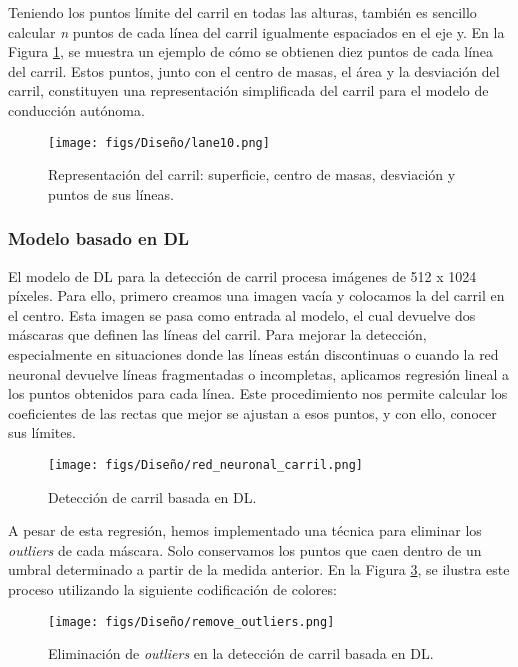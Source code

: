 Teniendo los puntos límite del carril en todas las alturas, también es sencillo calcular \textit{n} puntos de cada línea del carril igualmente espaciados en el eje y. En la Figura \ref{fig:puntos_carril}, se muestra un ejemplo de cómo se obtienen diez puntos de cada línea del carril. Estos puntos, junto con el centro de masas, el área y la desviación del carril, constituyen una representación simplificada del carril para el modelo de conducción autónoma.

\begin{figure}[ht]
  \centering
  \texttt{[image: figs/Diseño/lane10.png]}
  \caption{Representación del carril: superficie, centro de masas, desviación y puntos de sus líneas.}
  \label{fig:puntos_carril}
\end{figure}

\subsubsection{Modelo basado en \ac{DL}}

El modelo de \ac{DL} para la detección de carril procesa imágenes de 512 x 1024 píxeles. Para ello, primero creamos una imagen vacía y colocamos la del carril en el centro. Esta imagen se pasa como entrada al modelo, el cual devuelve dos máscaras que definen las líneas del carril. Para mejorar la detección, especialmente en situaciones donde las líneas están discontinuas o cuando la red neuronal devuelve líneas fragmentadas o incompletas, aplicamos regresión lineal a los puntos obtenidos para cada línea. Este procedimiento nos permite calcular los coeficientes de las rectas que mejor se ajustan a esos puntos, y con ello, conocer sus límites.

\begin{figure}[ht]
  \centering
  \texttt{[image: figs/Diseño/red\_neuronal\_carril.png]}
  \caption{Detección de carril basada en \ac{DL}.}
  \label{fig:dl_final_carril}
\end{figure}

A pesar de esta regresión, hemos implementado una técnica para eliminar los \textit{outliers} de cada máscara. Solo conservamos los puntos que caen dentro de un umbral determinado a partir de la medida anterior. En la Figura \ref{fig:outliers}, se ilustra este proceso utilizando la siguiente codificación de colores:

\begin{figure}[ht]
  \centering
  \texttt{[image: figs/Diseño/remove\_outliers.png]}
  \caption{Eliminación de \textit{outliers} en la detección de carril basada en \ac{DL}.}
  \label{fig:outliers}
\end{figure}

